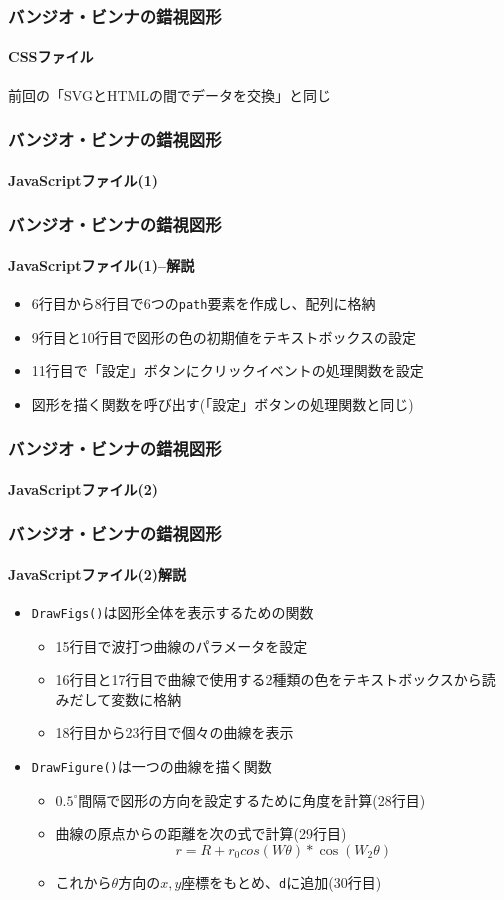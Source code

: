 \begin{frame}[containsverbatim]
 \frametitle{バンジオ・ビンナの錯視図形}
 \framesubtitle{CSSファイル}
 前回の「SVGとHTMLの間でデータを交換」と同じ
\end{frame}
\begin{frame}[containsverbatim]
 \frametitle{バンジオ・ビンナの錯視図形}
 \framesubtitle{JavaScriptファイル(1)}
\end{frame}
\begin{frame}[containsverbatim]
 \frametitle{バンジオ・ビンナの錯視図形}
 \framesubtitle{JavaScriptファイル(1)--解説}
 \begin{itemize}
  \item 6行目から8行目で6つの\texttt{path}要素を作成し、配列に格納
  \item 9行目と10行目で図形の色の初期値をテキストボックスの設定
  \item 11行目で「設定」ボタンにクリックイベントの処理関数を設定
  \item 図形を描く関数を呼び出す(「設定」ボタンの処理関数と同じ)
 \end{itemize}
\end{frame}
\begin{frame}[containsverbatim]
 \frametitle{バンジオ・ビンナの錯視図形}
 \framesubtitle{JavaScriptファイル(2)}
\end{frame}
\begin{frame}[containsverbatim]
 \frametitle{バンジオ・ビンナの錯視図形}
 \framesubtitle{JavaScriptファイル(2)解説}
\begin{itemize}
 \item \texttt{DrawFigs()}は図形全体を表示するための関数
 \begin{itemize}
	\item 15行目で波打つ曲線のパラメータを設定
	\item 16行目と17行目で曲線で使用する2種類の色をテキストボックスから読
				みだして変数に格納
	\item 18行目から23行目で個々の曲線を表示
 \end{itemize}
 \item \texttt{DrawFigure()}は一つの曲線を描く関数
\begin{itemize}
 \item $0.5^{\circ}$間隔で図形の方向を設定するために角度を計算(28行目)
 \item 曲線の原点からの距離を次の式で計算(29行目)
			 \[
				r = R + r_0cos(W\theta)*\cos(W_2\theta)
			 \]
 \item これから$\theta$方向の$x,y$座標をもとめ、\texttt{d}に追加(30行目)
\end{itemize}
\end{itemize}
\end{frame}
